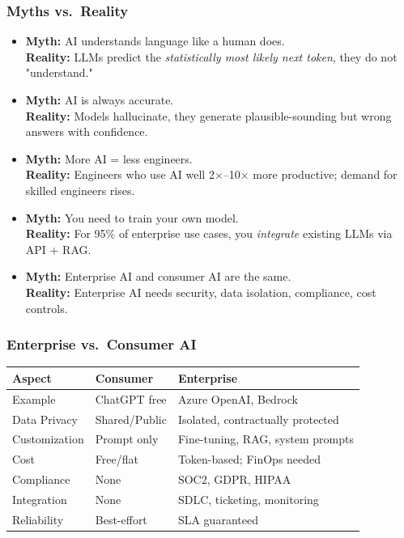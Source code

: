 \begin{frame}[fragile]\frametitle{Myths vs.\ Reality}
\begin{itemize}
\item \textbf{Myth:} AI understands language like a human does.\\
  \textbf{Reality:} LLMs predict the \textit{statistically most likely next token}, they do not "understand."
\item \textbf{Myth:} AI is always accurate.\\
  \textbf{Reality:} Models hallucinate, they generate plausible-sounding but wrong answers with confidence.
\item \textbf{Myth:} More AI = less engineers.\\
  \textbf{Reality:} Engineers who use AI well 2$\times$--10$\times$ more productive; demand for skilled engineers rises.
\item \textbf{Myth:} You need to train your own model.\\
  \textbf{Reality:} For 95\% of enterprise use cases, you \textit{integrate} existing LLMs via API + RAG.
\item \textbf{Myth:} Enterprise AI and consumer AI are the same.\\
  \textbf{Reality:} Enterprise AI needs security, data isolation, compliance, cost controls.
\end{itemize}
\end{frame}

\begin{frame}[fragile]\frametitle{Enterprise vs.\ Consumer AI}
\begin{center}
\begin{tabular}{|p{1.8cm}|p{1.8cm}|p{3cm}|}
\hline
\textbf{Aspect} & \textbf{Consumer} & \textbf{Enterprise} \\
\hline
Example & ChatGPT free & Azure OpenAI, Bedrock \\
Data Privacy & Shared/Public & Isolated, contractually protected \\
Customization & Prompt only & Fine-tuning, RAG, system prompts \\
Cost & Free/flat & Token-based; FinOps needed \\
Compliance & None & SOC2, GDPR, HIPAA \\
Integration & None & SDLC, ticketing, monitoring \\
Reliability & Best-effort & SLA guaranteed \\
\hline
\end{tabular}
\end{center}
\end{frame}

